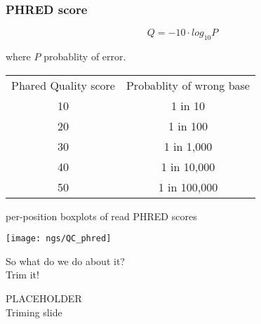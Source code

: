 \documentclass[xcolor=dvipsnames]{beamer}
\begin{document}
\begin{frame}
	\frametitle{PHRED score}
	$$ Q = -10 \cdot log_{10}P $$

	\vspace{0.5cm}
	\large
	where $P$ probablity of error.

	\vspace{1cm}
	\begin{tabular}{c c}
	Phared Quality score & Probablity of wrong base \\
	10 & 1 in 10  \\
	20 & 1 in 100  \\
	30 & 1 in 1,000 \\
	40 & 1 in 10,000 \\
	50 & 1 in 100,000 \\
	\end{tabular}
\end{frame}

\begin{frame}
	\large
	per-position boxplots of read PHRED scores \\
	\begin{center}
		\texttt{[image: ngs/QC\_phred]}
	\end{center}
\end{frame}

\begin{frame}
	\begin{center}
		So what do we do about it? \\
		Trim it!
	\end{center}
\end{frame}

\begin{frame}
	\begin{center}
		PLACEHOLDER \\
		Triming slide \\
	\end{center}
\end{frame}
\end{document}

